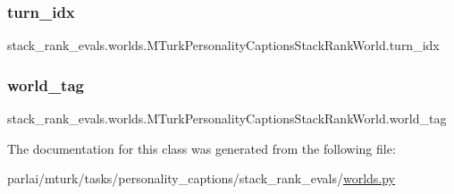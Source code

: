 \subsubsection{\texorpdfstring{turn\+\_\+idx}{turn\_idx}}
{\footnotesize\ttfamily stack\+\_\+rank\+\_\+evals.\+worlds.\+M\+Turk\+Personality\+Captions\+Stack\+Rank\+World.\+turn\+\_\+idx}

\mbox{\label{classstack__rank__evals_1_1worlds_1_1MTurkPersonalityCaptionsStackRankWorld_a4e5521465cddfe352b897ca6b7d36ae5}} 
\subsubsection{\texorpdfstring{world\+\_\+tag}{world\_tag}}
{\footnotesize\ttfamily stack\+\_\+rank\+\_\+evals.\+worlds.\+M\+Turk\+Personality\+Captions\+Stack\+Rank\+World.\+world\+\_\+tag}



The documentation for this class was generated from the following file\+:\begin{DoxyCompactItemize}
\item 
parlai/mturk/tasks/personality\+\_\+captions/stack\+\_\+rank\+\_\+evals/\hyperlink{parlai_2mturk_2tasks_2personality__captions_2stack__rank__evals_2worlds_8py}{worlds.\+py}\end{DoxyCompactItemize}
